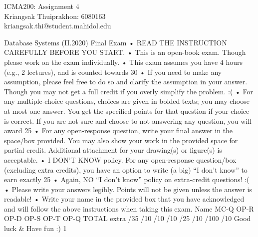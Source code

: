 \documentclass[a4paper, 11pt]{article}
\makeatletter
\newcommand{\myname}{Kriangsak Thuiprakhon: 6080163}
\newcommand{\myemail}{kriangsak.thi@student.mahidol.edu}
\newcommand{\myhwnum}{4}
\makeatother
\begin{document}
\medskip                        %

\thispagestyle{plain}
\begin{center}                  %
{\Large ICMA200: Assignment \myhwnum} \\
\myname \\
\myemail \\
\end{center}

Database Systems (II.2020) Final Exam
• READ THE INSTRUCTION CAREFULLY BEFORE YOU START.
• This is an open-book exam. Though please work on the exam individually.
• This exam assumes you have 4 hours (e.g., 2 lectures), and is counted towards 30%
• If you need to make any assumption, please feel free to do so and clarify the assumption in your answer. Though you may not get a full credit if you overly simplify the problem. :(
• For any multiple-choice questions, choices are given in bolded texts; you may choose at most one answer. You get the specified points for that question if your choice is correct. If you are not sure and choose to not answering any question, you will award 25%
• For any open-response question, write your final answer in the space/box provided. You may also show your work in the provided space for partial credit. Additional attachment for your drawing(s) or figure(s) is acceptable.
• I DON’T KNOW policy. For any open-response question/box (excluding extra credits), you have an option to write (a big) “I don’t know” to earn exactly 25%
• Again, NO “I don’t know” policy on extra-credit questions! :(
• Please write your answers legibly. Points will not be given unless the answer is readable!
• Write your name in the provided box that you have acknowledged and will follow the above instructions when taking this exam.
Name
MC-Q OP-R OP-D OP-S OP-T OP-Q TOTAL extra
/35 /10 /10 /10 /25 /10 /100 /10
Good luck & Have fun :)
     1
\end{document}
